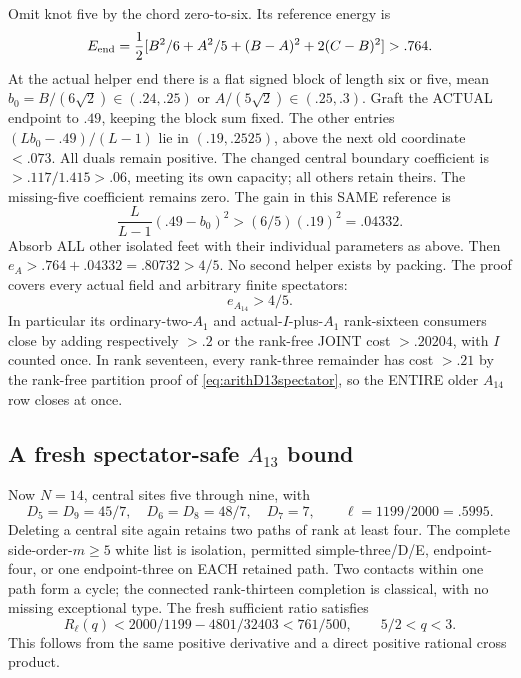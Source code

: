 \documentclass[11pt]{article}
\begin{document}
Omit knot five by the chord zero-to-six.
Its reference energy is
\[
 E_{\rm end}={\frac{1}{2}}
       [B^2/6+A^2/5+(B-A)^2+2(C-B)^2]>.764 .
\]
At the actual helper end there is a flat signed
block of length six or five, mean
\(b_0=B/(6\sqrt2)\in(.24,.25)\) or
\(A/(5\sqrt2)\in(.25,.3)\).
Graft the ACTUAL endpoint to \(.49\),
keeping the block sum fixed.
The other entries
\((Lb_0-.49)/(L-1)\) lie in \((.19,.2525)\),
above the next old coordinate \(<.073\).
All duals remain positive.
The changed central boundary coefficient is
\(>.117/1.415>.06\), meeting its own capacity;
all others retain theirs.
The missing-five coefficient remains zero.
The gain in this SAME reference is
\[
                  {\frac{L}{L-1}}(.49-b_0)^2
                                  >(6/5)(.19)^2=.04332 .
\]
Absorb ALL other isolated feet with their
individual parameters as above.
Then \(e_A>.764+.04332=.80732>4/5\).
No second helper exists by packing.
The proof covers every actual field and
arbitrary finite spectators:
\[
                                  e_{A_{14}}>4/5 .
\tag{A14U}\label{eq:arithA14universal}
\]
In particular its ordinary-two-\(A_1\) and
actual-\(I\)-plus-\(A_1\) rank-sixteen consumers
close by adding respectively \(>.2\) or the
rank-free JOINT cost \(>.20204\), with \(I\)
counted once.
In rank seventeen, every rank-three remainder
has cost \(>.21\) by the rank-free partition proof of
\eqref{eq:arithD13spectator}, so the ENTIRE
older \(A_{14}\) row closes at once.

\subsection[A fresh spectator-safe A13 bound]{A fresh spectator-safe \(A_{13}\) bound}
\label{app:arithA13universal}

Now \(N=14\), central sites five through nine,
with
\[
 D_5=D_9=45/7,\quad D_6=D_8=48/7,\quad D_7=7,\qquad
 \ell=1199/2000=.5995 .
\]
Deleting a central site again retains two
paths of rank at least four.
The complete side-order-\(m\ge5\) white list
is isolation, permitted simple-three/D/E,
endpoint-four, or one endpoint-three on EACH
retained path.
Two contacts within one path form a cycle;
the connected rank-thirteen completion is
classical, with no missing exceptional type.
The fresh sufficient ratio satisfies
\[
 R_\ell(q)<2000/1199-4801/32403<761/500,\qquad 5/2<q<3 .
\]
This follows from the same positive derivative
and a direct positive rational cross product.
\end{document}
